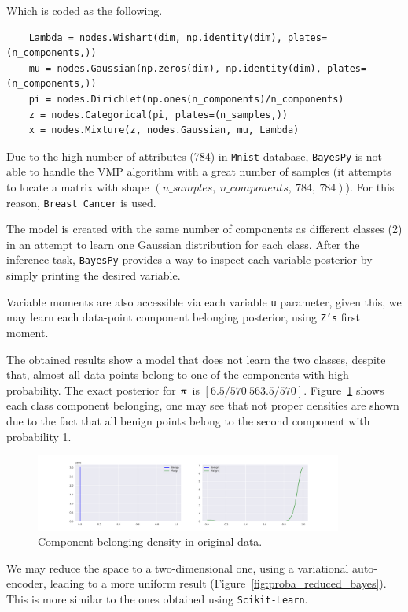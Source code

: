 Which is coded as the following.
\begin{verbatim}
    Lambda = nodes.Wishart(dim, np.identity(dim), plates=(n_components,))
    mu = nodes.Gaussian(np.zeros(dim), np.identity(dim), plates=(n_components,))
    pi = nodes.Dirichlet(np.ones(n_components)/n_components)
    z = nodes.Categorical(pi, plates=(n_samples,))
    x = nodes.Mixture(z, nodes.Gaussian, mu, Lambda)
\end{verbatim}

Due to the high number of attributes (784) in \texttt{Mnist} database, \texttt{BayesPy} is not able to handle the VMP algorithm with a great number of samples (it attempts to locate a matrix with shape \((n\_samples,\ n\_components,\ 784,\ 784)\)). For this reason, \texttt{Breast Cancer} is used.

The model is created with the same number of components as different classes (2) in an attempt to learn one Gaussian distribution for each class. After the inference task, \texttt{BayesPy} provides a way to inspect each variable posterior by simply printing the desired variable.

Variable moments are also accessible via each variable \texttt{u} parameter, given this, we may learn each data-point component belonging posterior, using \texttt{Z's} first moment.

The obtained results show a model that does not learn the two classes, despite that, almost all data-points belong to one of the components with high probability. The exact posterior for \(\bm{\pi}\) is \([6.5/570\  563.5/570]\).  Figure~\ref{fig:proba_original_bayes} shows each class component belonging, one may see that not proper densities are shown due to the fact that all benign points belong to the second component with probability 1.

\begin{figure}[h!]
  \centering
  \includegraphics[width=0.9\textwidth]{tex/images/proba_original_bayes.pdf}
  \caption{Component belonging density in original data.}\label{fig:proba_original_bayes}
\end{figure}

We may reduce the space to a two-dimensional one, using a variational auto-encoder, leading to a more uniform result (Figure~\ref{fig:proba_reduced_bayes}). This is more similar to the ones obtained using \texttt{Scikit-Learn}.
 

